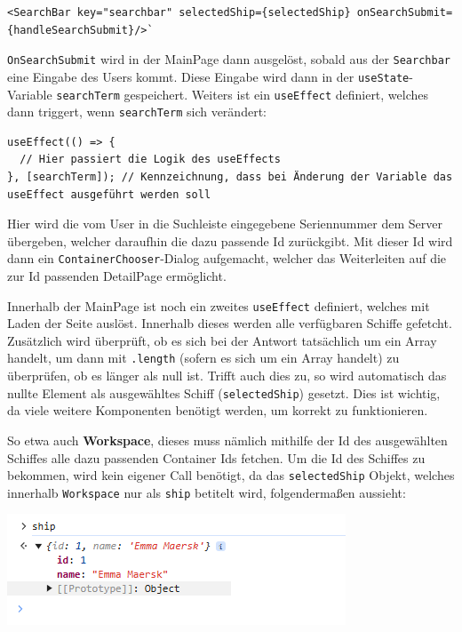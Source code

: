 \documentclass[
    headings=optiontotocandhead,%
    twoside,
    numbers=noenddot,%
    12pt, %
    titlepage, %
    parskip=full, %
    listof=leveldown, 
    numbers=noenddot, %
    a4paper,DIV=14,
    BCOR=15mm,
]{scrbook}
\newcommand{\passthrough}[1]{#1}
\let\origfigure=\figure
\let\endorigfigure=\endfigure
\renewenvironment{figure}[1][]{%
   \origfigure[H]
}{%
   \endorigfigure
}
\begin{document}
\begin{lstlisting}[caption={Searchbar Implementierung in der MainPAge}]
<SearchBar key="searchbar" selectedShip={selectedShip} onSearchSubmit={handleSearchSubmit}/>`
\end{lstlisting}

\passthrough{\lstinline!OnSearchSubmit!} wird in der MainPage dann
ausgelöst, sobald aus der \passthrough{\lstinline!Searchbar!} eine
Eingabe des Users kommt. Diese Eingabe wird dann in der
\passthrough{\lstinline!useState!}-Variable
\passthrough{\lstinline!searchTerm!} gespeichert. Weiters ist ein
\passthrough{\lstinline!useEffect!} definiert, welches dann triggert,
wenn \passthrough{\lstinline!searchTerm!} sich verändert:

\begin{lstlisting}[caption={Kennzeichnung eines Trigger eines useEffect}]
useEffect(() => {
  // Hier passiert die Logik des useEffects
}, [searchTerm]); // Kennzeichnung, dass bei Änderung der Variable das useEffect ausgeführt werden soll
\end{lstlisting}

Hier wird die vom User in die Suchleiste eingegebene Seriennummer dem
Server übergeben, welcher daraufhin die dazu passende Id zurückgibt. Mit
dieser Id wird dann ein
\passthrough{\lstinline!ContainerChooser!}-Dialog aufgemacht, welcher
das Weiterleiten auf die zur Id passenden DetailPage ermöglicht.

Innerhalb der MainPage ist noch ein zweites
\passthrough{\lstinline!useEffect!} definiert, welches mit Laden der
Seite auslöst. Innerhalb dieses werden alle verfügbaren Schiffe
gefetcht. Zusätzlich wird überprüft, ob es sich bei der Antwort
tatsächlich um ein Array handelt, um dann mit
\passthrough{\lstinline!.length!} (sofern es sich um ein Array handelt)
zu überprüfen, ob es länger als null ist. Trifft auch dies zu, so wird
automatisch das nullte Element als ausgewähltes Schiff
(\passthrough{\lstinline!selectedShip!}) gesetzt. Dies ist wichtig, da
viele weitere Komponenten benötigt werden, um korrekt zu funktionieren.

So etwa auch \textbf{Workspace}, dieses muss nämlich mithilfe der Id des
ausgewählten Schiffes alle dazu passenden Container Ids fetchen. Um die
Id des Schiffes zu bekommen, wird kein eigener Call benötigt, da das
\passthrough{\lstinline!selectedShip!} Objekt, welches innerhalb
\passthrough{\lstinline!Workspace!} nur als
\passthrough{\lstinline!ship!} betitelt wird, folgendermaßen aussieht:

\begin{figure}
\centering
\includegraphics{img/Gekle/ShipVar.png}
\caption{Aus Backend überliefertes selectedShip Objekt}
\end{figure}
\end{document}
